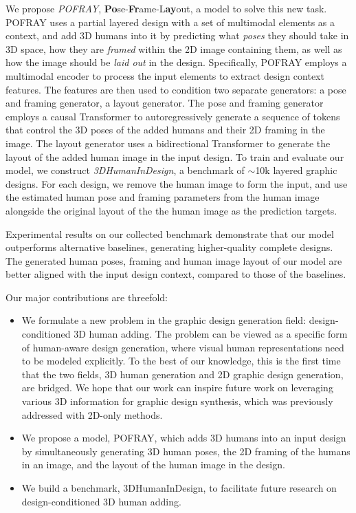 We propose \textit{POFRAY}, \textbf{Po}se-\textbf{Fr}ame-L\textbf{ay}out, a model to solve this new task. POFRAY uses a partial layered design with a set of multimodal elements as a context, and add 3D humans into it by predicting what \textit{poses} they should take in 3D space, how they are \textit{framed} within the 2D image containing them, as well as how the image should be \textit{laid out} in the design. 
Specifically, POFRAY employs a multimodal encoder to process the input elements to extract design context features. The features are then used to condition two separate generators: a pose and framing generator, a layout generator. 
The pose and framing generator employs a causal Transformer to autoregressively generate a sequence of tokens that control the 3D poses of the added humans and their 2D framing in the image. The layout generator uses a bidirectional Transformer to generate the layout of the added human image in the input design. To train and evaluate our model, we construct \textit{3DHumanInDesign}, a benchmark of $\sim$10k layered graphic designs. For each design, we remove the human image
to form the input, and use the estimated human pose and framing parameters from the human image alongside the original layout of the the human image as the prediction targets.

Experimental results on our collected benchmark demonstrate that our model outperforms alternative baselines, generating higher-quality complete designs. The generated human poses, framing and human image layout of our model are better aligned with the input design context, compared to those of the baselines.     

Our major contributions are threefold:
\begin{itemize}
    \item We formulate a new problem in the graphic design generation field: design-conditioned 3D human adding. The problem can be viewed as a specific form of human-aware design generation, where visual human representations need to be modeled explicitly. To the best of our knowledge, this is the first time that the two fields, 3D human generation and 2D graphic design generation, are bridged. We hope that our work can inspire future work on leveraging various 3D information for graphic design synthesis, which was previously addressed with 2D-only methods.
    \item We propose a model, POFRAY, which adds 3D humans into an input design by simultaneously generating 3D human poses, the 2D framing of the humans in an image, and the layout of the human image in the design.
    \item We build a benchmark, 3DHumanInDesign, to facilitate future research on design-conditioned 3D human adding.
\end{itemize}

